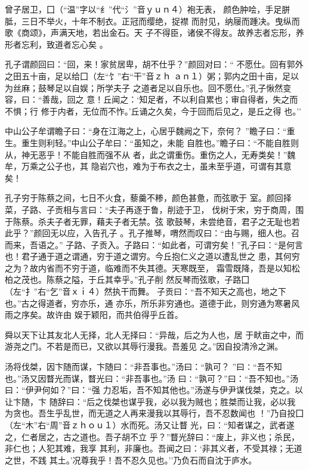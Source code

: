 \documentclass[]{article}
\begin{document}
曾子居卫，囗（``温''字以``纟''代``氵''音ｙｕｎ４）袍无表，
颜色肿哙，手足胼胝，三日不举火，十年不制衣。正冠而缨绝，捉襟
而肘见，纳屦而踵决。曳纵而歌《商颂》，声满天地，若出金石。天
子不得臣，诸侯不得友。故养志者忘形，养形者忘利，致道者忘心矣 。

孔子谓颜回曰：``回，来！家贫居卑，胡不仕乎？''颜回对曰：``
不愿仕。回有郭外之田五十亩，足以给囗（左``饣''右``干''音ｚｈ
ａｎ１）粥；郭内之田十亩，足以为丝麻；鼓琴足以自娱；所学夫子
之道者足以自乐也。回不愿仕。''孔子愀然变容，曰：``善哉，回之
意！丘闻之：`知足者，不以利自累也；审自得者，失之而不惧；行
修于内者，无位而不怍。'丘诵之久矣，今于回而后见之，是丘之得 也。''

中山公子牟谓瞻子曰：``身在江海之上，心居乎魏阙之下，奈何？
''瞻子曰：``重生。重生则利轻。''中山公子牟曰：``虽知之，未能
自胜也。''瞻子曰：``不能自胜则从，神无恶乎！不能自胜而强不从
者，此之谓重伤。重伤之人，无寿类矣！''魏牟，万乘之公子也，其
隐岩穴也，难为于布衣之士，虽未至乎道，可谓有其意矣！

孔子穷于陈蔡之间，七日不火食，藜羹不糁，颜色甚惫，而弦歌于
室。颜回择菜，子路、子贡相与言曰：``夫子再逐于鲁，削迹于卫，
伐树于宋，穷于商周，围于陈蔡。杀夫子者无罪，藉夫子者无禁。弦
歌鼓琴，未尝绝音，君子之无耻也若此乎？''颜回无以应，入告孔子
。孔子推琴，喟然而叹曰：``由与赐，细人也。召而来，吾语之。''
子路、子贡入。子路曰：``如此者，可谓穷矣！''孔子曰：``是何言
也！君子通于道之谓通，穷于道之谓穷。今丘抱仁义之道以遭乱世之
患，其何穷之为？故内省而不穷于道，临难而不失其德。天寒既至，
霜雪既降，吾是以知松柏之茂也。陈蔡之隘，于丘其幸乎。''孔子削
然反琴而弦歌，子路囗（左``扌''右``乞''音ｘｉ４）然执干而舞。
子贡曰：``吾不知天之高也，地之下也。''古之得道者，穷亦乐，通
亦乐，所乐非穷通也。道德于此，则穷通为寒暑风雨之序矣。故许由
娱于颖阳，而共伯得乎丘首。

舜以天下让其友北人无择，北人无择曰：``异哉，后之为人也，居
于畎亩之中，而游尧之门。不若是而已，又欲以其辱行漫我。吾羞见
之。''因自投清泠之渊。

汤将伐桀，因卞随而谋，卞随曰：``非吾事也。''汤曰：``孰可？
''曰∶``吾不知也。''汤又因瞀光而谋，瞀光曰：``非吾事也。''汤
曰∶``孰可？''曰：``吾不知也。''汤曰：``伊尹何如？''曰：``强
力忍垢，吾不知其他也。''汤遂与伊尹谋伐桀，克之。以让卞随，卞
随辞曰：``后之伐桀也谋乎我，必以我为贼也；胜桀而让我，必以我
为贪也。吾生乎乱世，而无道之人再来漫我以其辱行，吾不忍数闻也
！''乃自投囗（左``木''右``周''音ｚｈｏｕ１）水而死。汤又让瞀
光，曰：``知者谋之，武者遂之，仁者居之，古之道也。吾子胡不立
乎？''瞀光辞曰：``废上，非义也；杀民，非仁也；人犯其难，我享
其利，非廉也。吾闻之曰：`非其义者，不受其禄；无道之世，不践
其土。'况尊我乎！吾不忍久见也。''乃负石而自沈于庐水。
\end{document}
